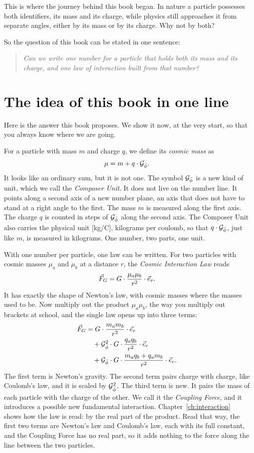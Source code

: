 This is where the journey behind this book began. In nature a particle possesses both identifiers, its mass and its charge, while physics still approaches it from separate angles, either by its mass or by its charge. Why not by both?

So the question of this book can be stated in one sentence:
\begin{quote}
\itshape Can we write one number for a particle that holds both its mass and its charge, and one law of interaction built from that number?
\end{quote}

\section{The idea of this book in one line}\label{sec:idea}

Here is the answer this book proposes. We show it now, at the very start, so that you always know where we are going.

For a particle with mass $m$ and charge $q$, we define its \emph{cosmic mass} as
\[
\mu = m + q \cdot \mathcal{G}_{\bar{\phi}} .
\]
It looks like an ordinary sum, but it is not one. The symbol $\mathcal{G}_{\bar{\phi}}$ is a new kind of unit, which we call the \emph{Composer Unit}. It does not live on the number line. It points along a second axis of a new number plane, an axis that does not have to stand at a right angle to the first. The mass $m$ is measured along the first axis. The charge $q$ is counted in steps of $\mathcal{G}_{\bar{\phi}}$ along the second axis. The Composer Unit also carries the physical unit [kg/C], kilograms per coulomb, so that $q \cdot \mathcal{G}_{\bar{\phi}}$, just like $m$, is measured in kilograms. One number, two parts, one unit.

With one number per particle, one law can be written. For two particles with cosmic masses $\mu_a$ and $\mu_b$ at a distance $r$, the \emph{Cosmic Interaction Law} reads
\[
\vec{F}_G = G \cdot \frac{\mu_a \mu_b}{r^2} \cdot \vec{e}_r .
\]
It has exactly the shape of Newton's law, with cosmic masses where the masses used to be. Now multiply out the product $\mu_a \mu_b$, the way you multiply out brackets at school, and the single law opens up into three terms:
\begin{align*}
\vec{F}_G &= G \cdot \frac{m_a m_b}{r^2} \cdot \vec{e}_r \\
          &\quad + \mathcal{G}_{\bar{\phi}}^2 \cdot G \cdot \frac{q_a q_b}{r^2} \cdot \vec{e}_r \\
          &\quad + \mathcal{G}_{\bar{\phi}} \cdot G \cdot \frac{m_a q_b + q_a m_b}{r^2} \cdot \vec{e}_r .
\end{align*}
The first term is Newton's gravity. The second term pairs charge with charge, like Coulomb's law, and it is scaled by $\mathcal{G}_{\bar{\phi}}^2$. The third term is new. It pairs the mass of each particle with the charge of the other. We call it the \emph{Coupling Force}, and it introduces a possible new fundamental interaction. Chapter~\ref{ch:interaction} shows how the law is read: by the real part of the product. Read that way, the first two terms are Newton's law and Coulomb's law, each with its full constant, and the Coupling Force has no real part, so it adds nothing to the force along the line between the two particles.

